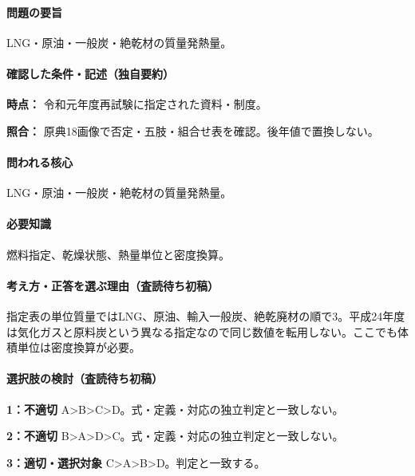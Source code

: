 \paragraph{問題の要旨} LNG・原油・一般炭・絶乾材の質量発熱量。

\paragraph{確認した条件・記述（独自要約）}\mbox{}\par

\noindent\textbf{時点：} 令和元年度再試験に指定された資料・制度。\par

\noindent\textbf{照合：} 原典18画像で否定・五肢・組合せ表を確認。後年値で置換しない。\par

\paragraph{問われる核心} LNG・原油・一般炭・絶乾材の質量発熱量。

\paragraph{必要知識} 燃料指定、乾燥状態、熱量単位と密度換算。

\paragraph{考え方・正答を選ぶ理由（査読待ち初稿）} 指定表の単位質量ではLNG、原油、輸入一般炭、絶乾廃材の順で3。平成24年度は気化ガスと原料炭という異なる指定なので同じ数値を転用しない。ここでも体積単位は密度換算が必要。

\paragraph{選択肢の検討（査読待ち初稿）}\mbox{}\par

\noindent\textbf{1：不適切} A>B>C>D。式・定義・対応の独立判定と一致しない。\par

\noindent\textbf{2：不適切} B>A>D>C。式・定義・対応の独立判定と一致しない。\par

\noindent\textbf{3：適切・選択対象} C>A>B>D。判定と一致する。\par

